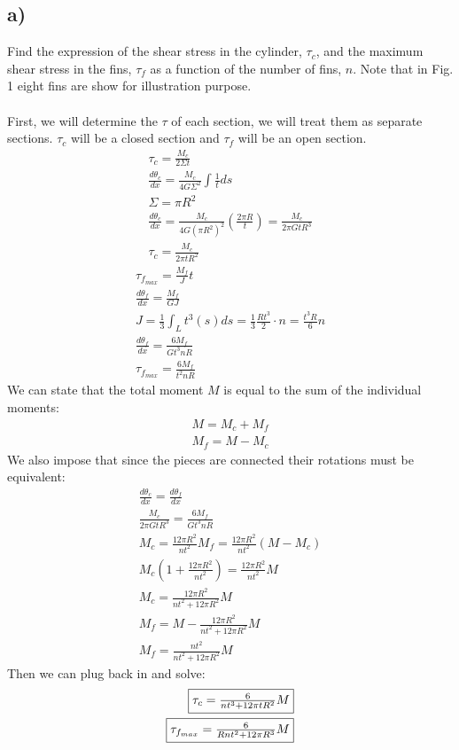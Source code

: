 \documentclass[12 pt]{article}
\begin{document}
\subsection*{a)}
Find the expression of the shear stress in the cylinder, $\tau_c$, and the maximum shear stress in
the fins, $\tau_f$ as a function of the number of fins, $n$. Note that in Fig. 1 eight fins are show for
illustration purpose. \\ \\
First, we will determine the $\tau$ of each section, we will treat them as separate sections. $\tau_c$ will be a closed
section and $\tau_f$ will be an open section.
\begin{align*}
    \tau_c=\frac{M_c}{2\Sigma t} \\
    \frac{d\theta_c}{dx}=\frac{M_c}{4G\Sigma^2}\int{\frac{1}{t}ds} \\
    \Sigma = \pi R^2 \\
    \frac{d\theta_c}{dx}=\frac{M_c}{4G(\pi R^2)^2}\left(\frac{2\pi R}{t}\right)=\frac{M_c}{2\pi GtR^3} \\
    \tau_c=\frac{M_c}{2\pi tR^2}
\end{align*}
\begin{align*}
    \tau_{f_{max}}=\frac{M_f}{J}t \\
    \frac{d\theta_f}{dx}=\frac{M_f}{GJ} \\
    J=\frac{1}{3}\int_{L}{t^3(s)ds}=\frac{1}{3}\frac{Rt^3}{2}\cdot n=\frac{t^3R}{6}n \\
    \frac{d\theta_f}{dx}=\frac{6M_f}{Gt^3nR} \\
    \tau_{f_{max}}=\frac{6M_f}{t^2nR}
\end{align*}
We can state that the total moment $M$ is equal to the sum of the individual moments:
\begin{align*}
    M=M_c+M_f \\
    M_f=M-M_c
\end{align*}
We also impose that since the pieces are connected their rotations must be equivalent:
\begin{align*}
    \frac{d\theta_c}{dx}=\frac{d\theta_f}{dx} \\
    \frac{M_c}{2\pi GtR^3}=\frac{6M_f}{Gt^3nR} \\
    M_c=\frac{12\pi R^2}{nt^2}M_f=\frac{12\pi R^2}{nt^2}(M-M_c) \\
    M_c(1+\frac{12\pi R^2}{nt^2})=\frac{12\pi R^2}{nt^2}M \\
    M_c=\frac{12\pi R^2}{nt^2+12\pi R^2}M \\
    M_f=M-\frac{12\pi R^2}{nt^2+12\pi R^2}M \\
    M_f=\frac{nt^2}{nt^2+12\pi R^2}M
\end{align*}
Then we can plug back in and solve:
\begin{align*}
    \fbox{$\tau_c=\frac{6}{nt^3+12\pi tR^2}M$} \\
    \fbox{$\tau_{f_{max}}=\frac{6}{Rnt^2+12\pi R^3}M$}
\end{align*}
\end{document}
